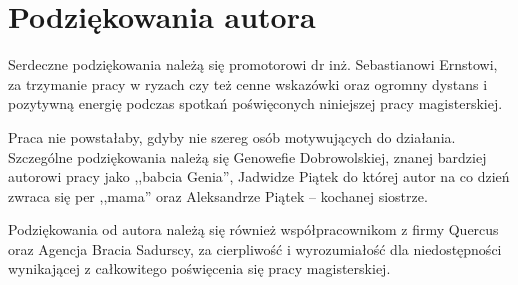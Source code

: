 \chapter{Podziękowania autora}
\label{cha:dodatekB}

Serdeczne podziękowania należą się promotorowi dr inż. Sebastianowi Ernstowi, za trzymanie pracy w ryzach czy też cenne wskazówki oraz ogromny dystans i pozytywną energię podczas spotkań poświęconych niniejszej pracy magisterskiej.

Praca nie powstałaby, gdyby nie szereg osób motywujących do działania. Szczególne podziękowania należą się Genowefie Dobrowolskiej, znanej bardziej autorowi pracy jako ,,babcia Genia'', Jadwidze Piątek do której autor na co dzień zwraca się per ,,mama'' oraz Aleksandrze Piątek -- kochanej siostrze.

Podziękowania od autora należą się również współpracownikom z firmy Quercus oraz Agencja Bracia Sadurscy, za cierpliwość i wyrozumiałość dla niedostępności wynikającej z całkowitego poświęcenia się pracy magisterskiej.

